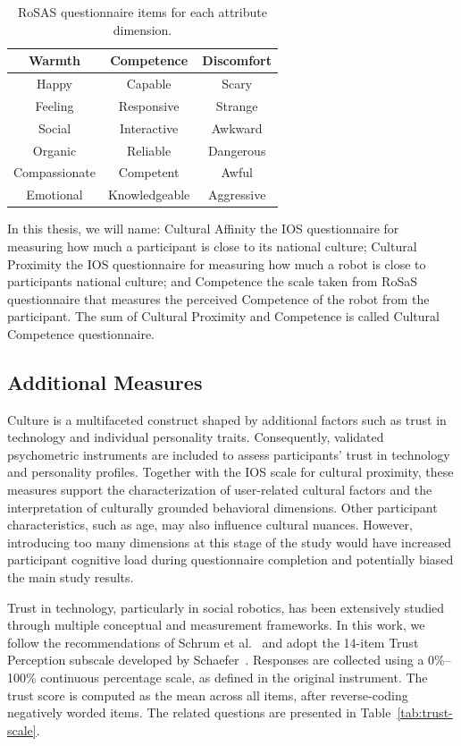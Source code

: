 \begin{table}[]
\centering
\begin{tabular}{c|c|c}
\textbf{Warmth} & \textbf{Competence} & \textbf{Discomfort} \\
\hline
Happy & Capable & Scary \\
Feeling & Responsive & Strange \\
Social & Interactive & Awkward \\
Organic & Reliable & Dangerous \\
Compassionate & Competent & Awful \\
Emotional & Knowledgeable & Aggressive \\
\end{tabular}
\caption{RoSAS questionnaire items for each attribute dimension.}
\label{ch5:tab:rosas}
\end{table}

 In this thesis, we will name: Cultural Affinity the IOS questionnaire for measuring how much a participant is close to its national culture; Cultural Proximity the IOS questionnaire for measuring how much a robot is close to participants national culture; and Competence the scale taken from RoSaS questionnaire that measures the perceived Competence of the robot from the participant. 
The sum of Cultural Proximity and Competence is called Cultural Competence questionnaire.

\subsection{Additional Measures}

Culture is a multifaceted construct shaped by additional factors such as trust in technology and individual personality traits. Consequently, validated psychometric instruments are included to assess participants’ trust in technology and personality profiles. Together with the IOS scale for cultural proximity, these measures support the characterization of user-related cultural factors and the interpretation of culturally grounded behavioral dimensions. Other participant characteristics, such as age, may also influence cultural nuances. However, introducing too many dimensions at this stage of the study would have increased participant cognitive load during questionnaire completion and potentially biased the main study results.

Trust in technology, particularly in social robotics, has been extensively studied through multiple conceptual and measurement frameworks. In this work, we follow the recommendations of Schrum et al.~\citep{schrum2020four} and adopt the 14-item Trust Perception subscale developed by Schaefer~\citep{schaefer2016measuring}. Responses are collected using a 0\%--100\% continuous percentage scale, as defined in the original instrument. The trust score is computed as the mean across all items, after reverse-coding negatively worded items. The related questions are presented in Table~\ref{tab:trust-scale}.


